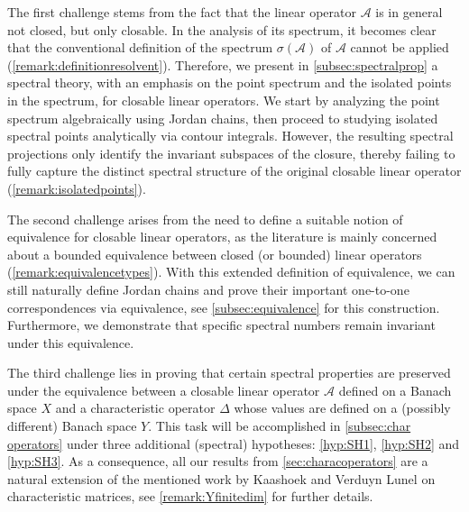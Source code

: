 \documentclass[english]{myarticle}
\begin{document}
\begin{sloppypar}
The first challenge stems from the fact that the linear operator $\mathcal{A}$ is in general not closed, but only closable. In the analysis of its spectrum, it becomes clear that the conventional definition of the spectrum $\sigma(\mathcal{A})$ of $\mathcal{A}$ cannot be applied (\cref{remark:definitionresolvent}). Therefore, we present in \cref{subsec:spectralprop} a spectral theory, with an emphasis on the point spectrum and the isolated points in the spectrum, for closable linear operators. We start by analyzing the point spectrum algebraically using Jordan chains, then proceed to studying isolated spectral points analytically via contour integrals. However, the resulting spectral projections only identify the invariant subspaces of the closure, thereby failing to fully capture the distinct spectral structure of the original closable linear operator (\cref{remark:isolatedpoints}).

The second challenge arises from the need to define a suitable notion of equivalence for closable linear operators, as the literature is mainly concerned about a bounded equivalence between closed (or bounded) linear operators (\cref{remark:equivalencetypes}). With this extended definition of equivalence, we can still naturally define Jordan chains and prove their important one-to-one correspondences via equivalence, see \cref{subsec:equivalence} for this construction. Furthermore, we demonstrate that specific spectral numbers remain invariant under this equivalence.

The third challenge lies in proving that certain spectral properties are preserved under the equivalence between a closable linear operator $\mathcal{A}$ defined on a Banach space $X$ and a characteristic operator $\Delta$ whose values are defined on a (possibly different) Banach space $Y$. This task will be accomplished in \cref{subsec:char operators} under three additional (spectral) hypotheses: \ref{hyp:SH1}, \ref{hyp:SH2} and \ref{hyp:SH3}. As a consequence, all our results from \cref{sec:characoperators} are a natural extension of the mentioned work by Kaashoek and Verduyn Lunel on characteristic matrices, see \cref{remark:Yfinitedim} for further details.


\end{sloppypar}
\end{document}
